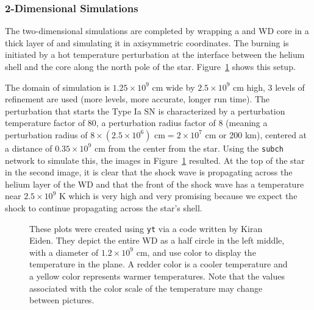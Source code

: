 \documentclass[preprint]{aastex62}
\begin{document}
      \newpage
        
    \subsubsection{2-Dimensional Simulations}
  
      The two-dimensional simulations are completed by wrapping a  and  WD core in a thick layer of  and simulating it in axisymmetric coordinates. The burning is initiated by a hot temperature perturbation at the interface between the helium shell and the core along the north pole of the star. Figure~\ref{fig:subchsims} shows this setup. 
      
         
      
      The domain of simulation is $1.25 \times 10^9$ cm wide by $2.5 \times 10^9$ cm high, 3 levels of refinement are used (more levels, more accurate, longer run time). The perturbation that starts the Type Ia SN is characterized by a perturbation temperature factor of 80, a perturbation radius factor of 8 (meaning a perturbation radius of $8 \times (2.5 \times 10^6) \text{ cm} = 2 \times 10^7 \text{ cm}$ or 200 km), centered at a distance of $0.35 \times 10^9$ cm from the center from the star. Using the {\tt subch} network to simulate this, the images in Figure~\ref{fig:subchsims} resulted. At the top of the star in the second image, it is clear that the shock wave is propagating across the helium layer of the WD and that the front of the shock wave has a temperature near $2.5 \times 10^9$ K which is very high and very promising because we expect the shock to continue propagating across the star's shell. 
      
      \begin{figure}
        \caption{These plots were created using {\tt yt} via a code written by Kiran Eiden. They depict the entire WD as a half circle in the left middle, with a diameter of $1.2 \times 10^9$ cm, and use color to display the temperature in the plane. A redder color is a cooler temperature and a yellow color represents warmer temperatures. Note that the values associated with the color scale of the temperature may change between pictures. 
          }
        \label{fig:subchsims}
      \end{figure}

   \newpage
\end{document}
